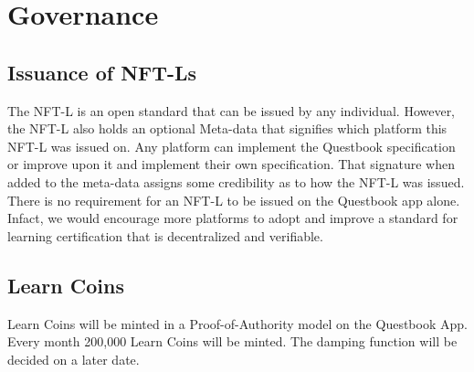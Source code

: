 \documentclass{article}
\begin{document}
  \section{Governance}
    \subsection{Issuance of NFT-Ls}
      The NFT-L is an open standard that can be issued by any individual. However, the NFT-L also holds an optional Meta-data that signifies which platform this NFT-L was issued on.
      Any platform can implement the Questbook specification or improve upon it and implement their own specification. That signature when added to the meta-data assigns some credibility as to how the NFT-L was issued.
      \break
      There is no requirement for an NFT-L to be issued on the Questbook app alone. Infact, we would encourage more platforms to adopt and improve a standard for learning certification that is decentralized and verifiable.
    \subsection{Learn Coins}
      Learn Coins will be minted in a Proof-of-Authority model on the Questbook App. Every month 200,000 Learn Coins will be minted. The damping function will be decided on a later date.
\end{document}
